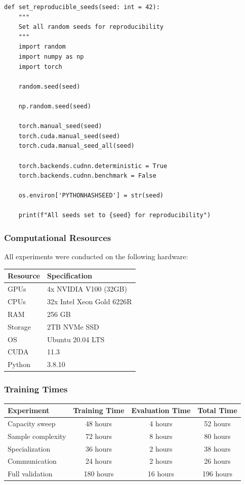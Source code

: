 \documentclass[10pt, letterpaper]{article}
\begin{document}
\begin{lstlisting}
def set_reproducible_seeds(seed: int = 42):
    """
    Set all random seeds for reproducibility
    """
    import random
    import numpy as np
    import torch

    random.seed(seed)

    np.random.seed(seed)

    torch.manual_seed(seed)
    torch.cuda.manual_seed(seed)
    torch.cuda.manual_seed_all(seed)

    torch.backends.cudnn.deterministic = True
    torch.backends.cudnn.benchmark = False

    os.environ['PYTHONHASHSEED'] = str(seed)

    print(f"All seeds set to {seed} for reproducibility")
\end{lstlisting}

\subsubsection{Computational Resources}

All experiments were conducted on the following hardware:

\begin{center}
\begin{tabular}{ll}
\toprule
\textbf{Resource} & \textbf{Specification} \\
\midrule
GPUs & 4x NVIDIA V100 (32GB) \\
CPUs & 32x Intel Xeon Gold 6226R \\
RAM & 256 GB \\
Storage & 2TB NVMe SSD \\
OS & Ubuntu 20.04 LTS \\
CUDA & 11.3 \\
Python & 3.8.10 \\
\bottomrule
\end{tabular}
\end{center}

\subsubsection{Training Times}

\begin{center}
\begin{tabular}{lccc}
\toprule
\textbf{Experiment} & \textbf{Training Time} & \textbf{Evaluation Time} & \textbf{Total Time} \\
\midrule
Capacity sweep & 48 hours & 4 hours & 52 hours \\
Sample complexity & 72 hours & 8 hours & 80 hours \\
Specialization & 36 hours & 2 hours & 38 hours \\
Communication & 24 hours & 2 hours & 26 hours \\
Full validation & 180 hours & 16 hours & 196 hours \\
\bottomrule
\end{tabular}
\end{center}
\end{document}
